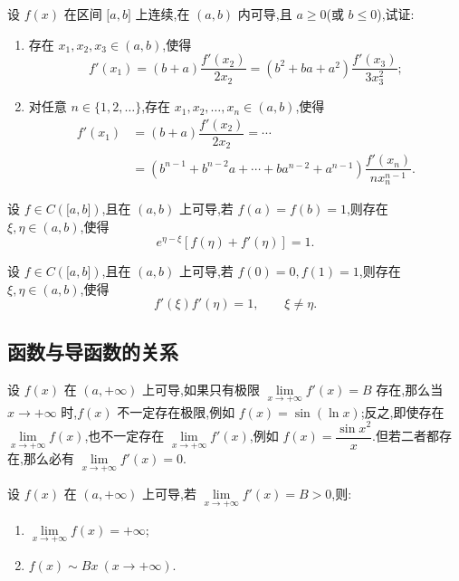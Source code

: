 \documentclass[../../数学分析培优讲义.tex]{subfiles}
\begin{document}
\begin{example}
设 $f(x)$ 在区间 $\lbrack a,b\rbrack$ 上连续,在 $(a,b)$ 内可导,且 $a\geq0$(或 $b\leq0$),试证:
\begin{enumerate}[label=(\arabic*)]
    \item 存在 $x_1,x_2,x_3\in(a,b)$,使得
    \[
        f'(x_1)
        =(b+a)\dfrac{f'(x_2)}{2x_2}
        =(b^2+ba+a^2)\dfrac{f'(x_3)}{3x_3^2};
    \]
    \item 对任意 $n\in\{1,2,\ldots\}$,存在 $x_1,x_2,\ldots,x_n\in(a,b)$,使得
    \[
    \begin{aligned}
        f'(x_1)
        &=(b+a)\dfrac{f'(x_2)}{2x_2}
        =\cdots\\
        &=(b^{n-1}+b^{n-2}a+\cdots+ba^{n-2}+a^{n-1})
        \dfrac{f'(x_n)}{nx_n^{n-1}}.
    \end{aligned}
    \]
\end{enumerate}
\end{example}
\exampleblank

\begin{example}
设 $f\in C(\lbrack a,b\rbrack)$,且在 $(a,b)$ 上可导,若 $f(a)=f(b)=1$,则存在 $\xi,\eta\in(a,b)$,使得
\[
    e^{\eta-\xi}[f(\eta)+f'(\eta)]=1.
\]
\end{example}
\exampleblank

\begin{example}
设 $f\in C(\lbrack a,b\rbrack)$,且在 $(a,b)$ 上可导,若 $f(0)=0,f(1)=1$,则存在 $\xi,\eta\in(a,b)$,使得
\[
    f'(\xi)f'(\eta)=1,
    \qquad \xi\neq\eta.
\]
\end{example}
\exampleblank



\subsection{函数与导函数的关系}

设 $f(x)$ 在 $(a,+\infty)$ 上可导,如果只有极限 $\displaystyle\lim\limits_{x\to+\infty}f'(x)=B$ 存在,那么当 $x\to+\infty$ 时,$f(x)$ 不一定存在极限,例如 $f(x)=\sin(\ln x)$;反之,即使存在 $\displaystyle\lim\limits_{x\to+\infty}f(x)$,也不一定存在 $\displaystyle\lim\limits_{x\to+\infty}f'(x)$,例如 $f(x)=\dfrac{\sin x^2}{x}$.但若二者都存在,那么必有 $\displaystyle\lim\limits_{x\to+\infty}f'(x)=0$.

\begin{example}
设 $f(x)$ 在 $(a,+\infty)$ 上可导,若 $\displaystyle\lim\limits_{x\to+\infty}f'(x)=B>0$,则:
\begin{enumerate}[label=(\arabic*)]
    \item $\displaystyle\lim\limits_{x\to+\infty}f(x)=+\infty$;
    \item $f(x)\sim Bx\ (x\to+\infty)$.
\end{enumerate}
\end{example}
\exampleblank
\end{document}
